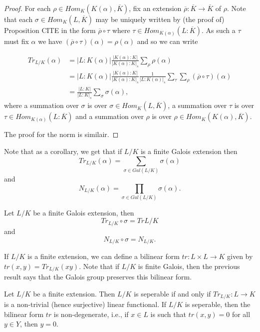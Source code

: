 \documentclass[twoside, a4paper, 10pt]{amsart}
\begin{document}
\begin{proof} For each $\rho \in Hom_{K}(K(\alpha), \overline{K})$, fix an extension $\overline{\rho}:\overline{K} \to \overline{K}$ of $\rho$. Note that each $\sigma \in Hom_{K}(L, \overline{K})$ may be uniquely written by (the proof of) Proposition CITE in the form $\overline{\rho} \circ \tau$ where $\tau \in Hom_{K(\alpha)}(L : \overline{K})$. As such a $\tau$ must fix $\alpha$ we have $(\overline{\rho} \circ \tau) (\alpha) = \rho(\alpha)$ and so we can write 

\begin{align*}Tr_{L/K}(\alpha) &= |L:K(\alpha)| \frac{|K(\alpha):K|}{|K(\alpha):K|_s} \sum_{\rho} \rho(\alpha) \\ 
&= |L:K(\alpha)| \frac{|K(\alpha):K|}{|K(\alpha):K|_s} \frac{1}{|L:K(\alpha)|_s} \sum_{\tau} \sum_{\rho} (\overline{\rho} \circ \tau)(\alpha) \\
&= \frac{|L:K|}{|L:K|_s} \sum_{\sigma} \sigma(\alpha), \end{align*} where a summation over $\sigma$ is over $\sigma \in  Hom_{K}(L, \overline{K})$, a summation over $\tau$ is over $ \tau \in Hom_{K(\alpha)}(L : \overline{K})$ and a summation over $\rho$ is over  $\rho \in Hom_{K}(K(\alpha), \overline{K})$.

The proof for the norm is similair.\end{proof}

Note that as a corollary, we get that if $L/K$ is a finite Galois extension then $$Tr_{L/K}(\alpha) = \sum_{\sigma \in Gal(L/K)} \sigma(\alpha)$$ and  $$N_{L/K}(\alpha) = \prod_{\sigma \in Gal(L/K)} \sigma(\alpha).$$
\begin{corol}\label{corol: galois fixed trace and norm} Let $L/K$ be a finite Galois extension, then $$Tr_{L/K} \circ \sigma = Tr{L/K}$$ and $$N_{L/K} \circ \sigma = N_{L/K}.$$

\end{corol}

If $L/K$ is a finite extension, we can define a bilinear form $tr:L \times L \to K$ given by $tr(x,y) = Tr_{L/K}(xy)$. Note that if $L/K$ is finite Galois, then the previous result says that the Galois group preserves this bilinear form.

\begin{prop} Let $L/K$ be a finite extension. Then $L/K$ is seperable if and only if $Tr_{L/K}:L \to K$ is a non-trivial (hence surjective) linear functional. If $L/K$ is seperable, then the bilinear form $tr$ is non-degenerate, i.e., if $x \in L$ is such that $tr(x,y) = 0$ for all $y \in Y$, then $y=0$.

\end{prop}
\end{document}
